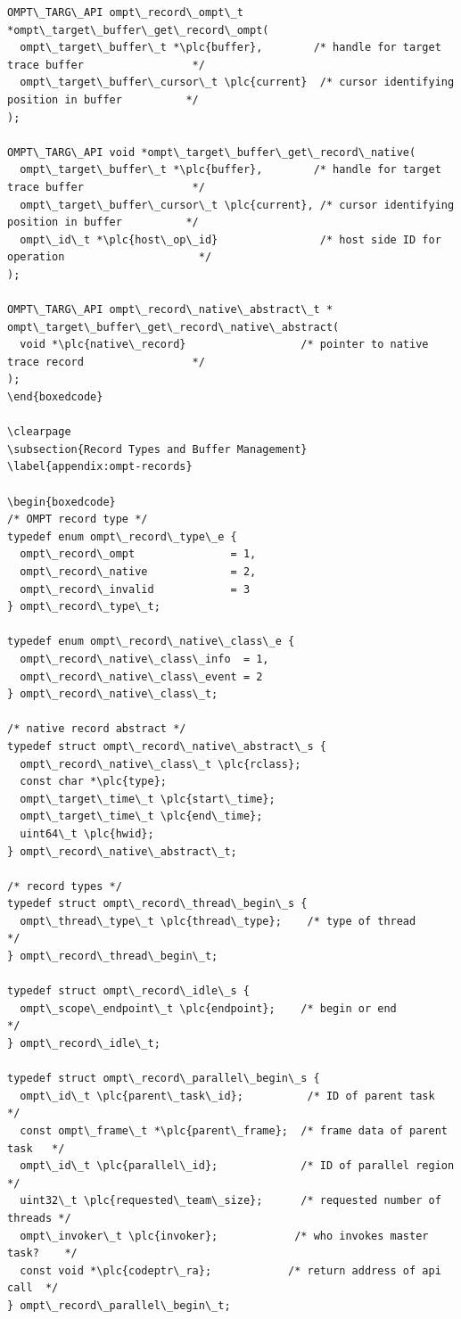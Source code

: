 \documentclass{article}
\begin{document}
\begin{boxedcode}
\begin{verbatim}
OMPT\_TARG\_API ompt\_record\_ompt\_t *ompt\_target\_buffer\_get\_record\_ompt(
  ompt\_target\_buffer\_t *\plc{buffer},        /* handle for target trace buffer                 */
  ompt\_target\_buffer\_cursor\_t \plc{current}  /* cursor identifying position in buffer          */
);
   
OMPT\_TARG\_API void *ompt\_target\_buffer\_get\_record\_native(
  ompt\_target\_buffer\_t *\plc{buffer},        /* handle for target trace buffer                 */
  ompt\_target\_buffer\_cursor\_t \plc{current}, /* cursor identifying position in buffer          */
  ompt\_id\_t *\plc{host\_op\_id}                /* host side ID for operation                     */
);
  
OMPT\_TARG\_API ompt\_record\_native\_abstract\_t *
ompt\_target\_buffer\_get\_record\_native\_abstract(
  void *\plc{native\_record}                  /* pointer to native trace record                 */
);
\end{boxedcode}

\clearpage  
\subsection{Record Types and Buffer Management}
\label{appendix:ompt-records}

\begin{boxedcode}
/* OMPT record type */
typedef enum ompt\_record\_type\_e {
  ompt\_record\_ompt               = 1,
  ompt\_record\_native             = 2,
  ompt\_record\_invalid            = 3
} ompt\_record\_type\_t; 

typedef enum ompt\_record\_native\_class\_e {
  ompt\_record\_native\_class\_info  = 1,
  ompt\_record\_native\_class\_event = 2
} ompt\_record\_native\_class\_t;

/* native record abstract */
typedef struct ompt\_record\_native\_abstract\_s {
  ompt\_record\_native\_class\_t \plc{rclass};
  const char *\plc{type};
  ompt\_target\_time\_t \plc{start\_time};
  ompt\_target\_time\_t \plc{end\_time};
  uint64\_t \plc{hwid};
} ompt\_record\_native\_abstract\_t;

/* record types */
typedef struct ompt\_record\_thread\_begin\_s {
  ompt\_thread\_type\_t \plc{thread\_type};    /* type of thread              */
} ompt\_record\_thread\_begin\_t;

typedef struct ompt\_record\_idle\_s {
  ompt\_scope\_endpoint\_t \plc{endpoint};    /* begin or end                */
} ompt\_record\_idle\_t;

typedef struct ompt\_record\_parallel\_begin\_s {
  ompt\_id\_t \plc{parent\_task\_id};          /* ID of parent task           */
  const ompt\_frame\_t *\plc{parent\_frame};  /* frame data of parent task   */
  ompt\_id\_t \plc{parallel\_id};             /* ID of parallel region       */
  uint32\_t \plc{requested\_team\_size};      /* requested number of threads */
  ompt\_invoker\_t \plc{invoker};            /* who invokes master task?    */
  const void *\plc{codeptr\_ra};            /* return address of api call  */ 
} ompt\_record\_parallel\_begin\_t;


\end{verbatim}
\end{boxedcode}
\end{document}
